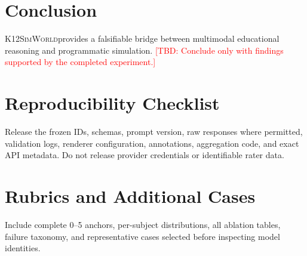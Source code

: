 \documentclass[11pt]{article}
\newcommand{\system}{\textsc{K12SimWorld}}
\newcommand{\tbd}[1]{\textcolor{red}{[TBD: #1]}}
\begin{document}
\section{Conclusion}
\system provides a falsifiable bridge between multimodal educational reasoning and programmatic
simulation. \tbd{Conclude only with findings supported by the completed experiment.}




\appendix
\section{Reproducibility Checklist}
Release the frozen IDs, schemas, prompt version, raw responses where permitted, validation logs,
renderer configuration, annotations, aggregation code, and exact API metadata. Do not release
provider credentials or identifiable rater data.

\section{Rubrics and Additional Cases}
Include complete 0--5 anchors, per-subject distributions, all ablation tables, failure taxonomy,
and representative cases selected before inspecting model identities.
\end{document}
